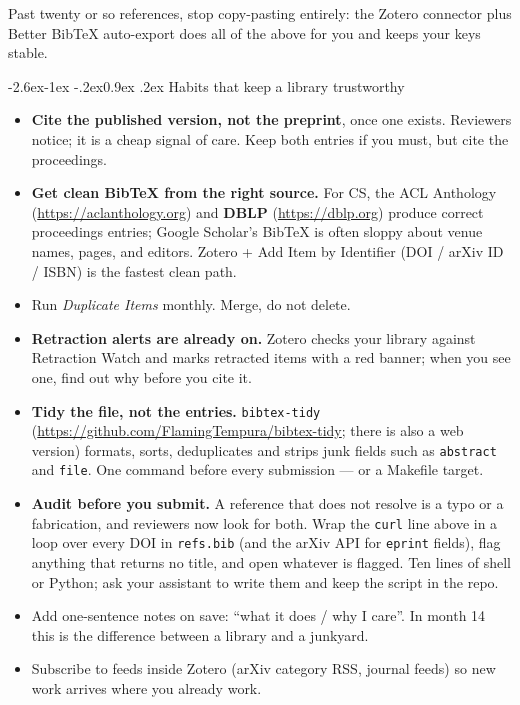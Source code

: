 \documentclass[11pt,a4paper]{article}
\makeatletter
\renewcommand\subsection{\@startsection{subsection}{2}{\z@}%
  {-2.6ex\@plus -1ex \@minus -.2ex}{0.9ex \@plus .2ex}%
  {\normalfont\large\bfseries\color{brandlight}}}
\newcommand{\code}[1]{\texttt{\small #1}}
\makeatother
\begin{document}
Past twenty or so references, stop copy-pasting entirely: the Zotero connector
plus Better BibTeX auto-export does all of the above for you and keeps your
keys stable.

\subsection{Habits that keep a library trustworthy}

\begin{itemize}
  \item \textbf{Cite the published version, not the preprint}, once one
        exists. Reviewers notice; it is a cheap signal of care. Keep both
        entries if you must, but cite the proceedings.
  \item \textbf{Get clean BibTeX from the right source.} For CS, the ACL
        Anthology (\url{https://aclanthology.org}) and
        \textbf{DBLP} (\url{https://dblp.org}) produce correct proceedings
        entries; Google Scholar's BibTeX is often sloppy about venue names,
        pages, and editors. Zotero + Add Item by Identifier (DOI / arXiv ID /
        ISBN) is the fastest clean path.
  \item Run \emph{Duplicate Items} monthly. Merge, do not delete.
  \item \textbf{Retraction alerts are already on.} Zotero checks your library
        against Retraction Watch and marks retracted items with a red banner;
        when you see one, find out why before you cite it.
  \item \textbf{Tidy the file, not the entries.} \code{bibtex-tidy}
        (\url{https://github.com/FlamingTempura/bibtex-tidy}; there is also a
        web version) formats, sorts, deduplicates and strips junk fields such
        as \code{abstract} and \code{file}. One command before every
        submission --- or a Makefile target.
  \item \textbf{Audit before you submit.} A reference that does not resolve
        is a typo or a fabrication, and reviewers now look for both. Wrap the
        \code{curl} line above in a loop over every DOI in \code{refs.bib}
        (and the arXiv API for \code{eprint} fields), flag anything that
        returns no title, and open whatever is flagged. Ten lines of shell or
        Python; ask your assistant to write them and keep the script in the
        repo.
  \item Add one-sentence notes on save: ``what it does / why I care''. In
        month 14 this is the difference between a library and a junkyard.
  \item Subscribe to feeds inside Zotero (arXiv category RSS, journal feeds) so
        new work arrives where you already work.
\end{itemize}
\end{document}

